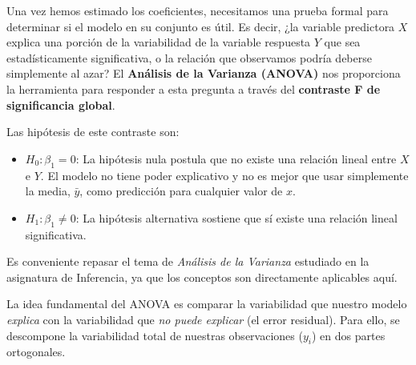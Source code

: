 \documentclass[
  letterpaper,
  DIV=11,
  numbers=noendperiod]{scrreprt}
\providecommand{\tightlist}{%
  \setlength{\itemsep}{0pt}\setlength{\parskip}{0pt}}
\begin{document}
Una vez hemos estimado los coeficientes, necesitamos una prueba formal
para determinar si el modelo en su conjunto es útil. Es decir, ¿la
variable predictora \(X\) explica una porción de la variabilidad de la
variable respuesta \(Y\) que sea estadísticamente significativa, o la
relación que observamos podría deberse simplemente al azar? El
\textbf{Análisis de la Varianza (ANOVA)} nos proporciona la herramienta
para responder a esta pregunta a través del \textbf{contraste F de
significancia global}.

Las hipótesis de este contraste son:

\begin{itemize}
\tightlist
\item
  \(H_0: \beta_1 = 0\): La hipótesis nula postula que no existe una
  relación lineal entre \(X\) e \(Y\). El modelo no tiene poder
  explicativo y no es mejor que usar simplemente la media, \(\bar{y}\),
  como predicción para cualquier valor de \(x\).
\item
  \(H_1: \beta_1 \neq 0\): La hipótesis alternativa sostiene que sí
  existe una relación lineal significativa.
\end{itemize}

\begin{tcolorbox}[enhanced jigsaw, leftrule=.75mm, breakable, colbacktitle=quarto-callout-caution-color!10!white, bottomrule=.15mm, colframe=quarto-callout-caution-color-frame, toprule=.15mm, colback=white, coltitle=black, bottomtitle=1mm, left=2mm, title=\textcolor{quarto-callout-caution-color}{\faFire}\hspace{0.5em}{Repaso}, opacityback=0, arc=.35mm, opacitybacktitle=0.6, toptitle=1mm, titlerule=0mm, rightrule=.15mm]

Es conveniente repasar el tema de \emph{Análisis de la Varianza}
estudiado en la asignatura de Inferencia, ya que los conceptos son
directamente aplicables aquí.

\end{tcolorbox}

La idea fundamental del ANOVA es comparar la variabilidad que nuestro
modelo \emph{explica} con la variabilidad que \emph{no puede explicar}
(el error residual). Para ello, se descompone la variabilidad total de
nuestras observaciones (\(y_i\)) en dos partes ortogonales.
\end{document}
